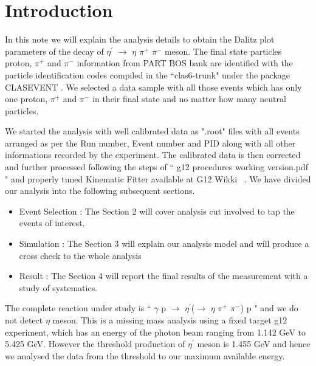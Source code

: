 \documentclass[12pt,a4paper]{amsbook}
\theoremstyle{definition}
\begin{document}
\thispagestyle{empty}


\pagestyle{plain}
 \thispagestyle{empty}

\newpage
\setcounter{page}{1}


\section{Introduction}
In this note we will explain the analysis details to obtain the Dalitz plot parameters of the decay of $\eta^{\prime}$ $\rightarrow$ $\eta$ $\pi^{+}$ $\pi^{-}$
meson. The final state particles proton, $\pi^{+}$ and $\pi^{-}$ information from PART BOS bank are identified with the particle identification codes compiled in the ``clas6-trunk" under the package CLASEVENT . We selected a data sample with all those events which has only one proton, $\pi^{+}$ and $\pi^{-}$ in their final state and no matter how many neutral particles. 


We started the analysis with well calibrated data as ".root" files with all events arranged as per the Run number, Event number and PID along with all other informations recorded by the experiment. The calibrated data is then corrected and further processed following the steps of `` g12 procedures working version.pdf " and properly tuned Kinematic Fitter available at G12 Wikki ~\cite{G12_AN}. We have divided our analysis into the following subsequent sections.

\begin {itemize}
\item Event Selection : The Section 2 will cover analysis cut involved to tap the events of interest.
\item Simulation : The Section 3 will explain our analysis model and will produce a cross check to the whole analysis
\item Result : The Section 4 will report the final results of the measurement with a study of systematics.  
\end {itemize}
The complete reaction under study is `` $\gamma$ p $\rightarrow$ $\eta^{\prime}$($\rightarrow$ $\eta$ $\pi^{+}$ $\pi^{-}$) p " and we do not detect $\eta$ meson. This is a missing mass analysis using a fixed target g12 experiment, which has an energy of the photon beam ranging from 1.142 GeV to  5.425 GeV. However the threshold production of $\eta^{\prime}$ meson is 1.455 GeV and hence we analysed the data from the threshold to our maximum available energy. 
\end{document}
